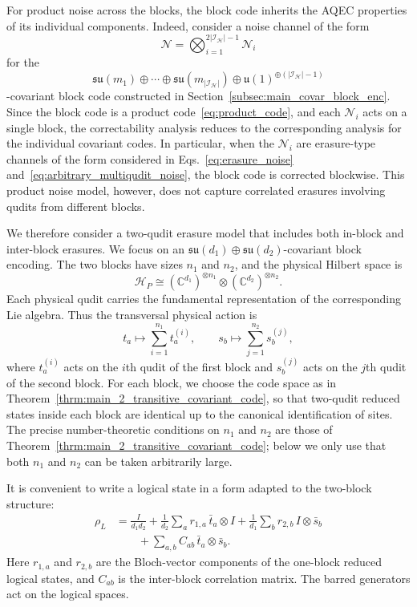 \documentclass[10pt,twocolumn,superscriptaddress,aps,amsmath,amssymb,citeautoscript,floatfix,prx,longbibliography]{revtex4-2}
\newcounter{alg}
\theoremstyle{plain}
\theoremstyle{plain}
\theoremstyle{plain}
\theoremstyle{plain}
\theoremstyle{plain}
\theoremstyle{plain}
\begin{document}
For product noise across the blocks, the block code inherits the AQEC properties of its individual components. Indeed, consider a noise channel of the form
$$
    \mathcal N
    =
    \bigotimes_{i=1}^{2|\mathcal I_{\mathcal H}|-1}
    \mathcal N_i
$$
for the
$$
    \mathfrak{su}(m_1)
    \oplus
    \cdots
    \oplus
    \mathfrak{su}(m_{|\mathcal I_{\mathcal H}|})
    \oplus
    \mathfrak{u}(1)^{\oplus(|\mathcal I_{\mathcal H}|-1)}
$$
-covariant block code constructed in Section~\ref{subsec:main_covar_block_enc}. Since the block code is a product code~\eqref{eq:product_code}, and each $\mathcal N_i$ acts on a single block, the correctability analysis reduces to the corresponding analysis for the individual covariant codes. In particular, when the $\mathcal N_i$ are erasure-type channels of the form considered in Eqs.~\eqref{eq:erasure_noise} and~\eqref{eq:arbitrary_multiqudit_noise}, the block code is corrected blockwise. This product noise model, however, does not capture correlated erasures involving qudits from different blocks.

We therefore consider a two-qudit erasure model that includes both in-block and inter-block erasures. We focus on an
$\mathfrak{su}(d_1)\oplus\mathfrak{su}(d_2)$-covariant block encoding. The two blocks have sizes $n_1$ and $n_2$, and the physical Hilbert space is
$$
    \mathcal H_P
    \cong
    (\mathbb C^{d_1})^{\otimes n_1}
    \otimes
    (\mathbb C^{d_2})^{\otimes n_2}.
$$
Each physical qudit carries the fundamental representation of the corresponding Lie algebra. Thus the transversal physical action is
$$
    t_a
    \longmapsto
    \sum_{i=1}^{n_1} t_a^{(i)},
    \qquad
    s_b
    \longmapsto
    \sum_{j=1}^{n_2} s_b^{(j)},
$$
where $t_a^{(i)}$ acts on the $i$th qudit of the first block and $s_b^{(j)}$ acts on the $j$th qudit of the second block. For each block, we choose the code space as in Theorem~\ref{thrm:main_2_transitive_covariant_code}, so that two-qudit reduced states inside each block are identical up to the canonical identification of sites. The precise number-theoretic conditions on $n_1$ and $n_2$ are those of Theorem~\ref{thrm:main_2_transitive_covariant_code}; below we only use that both $n_1$ and $n_2$ can be taken arbitrarily large.

It is convenient to write a logical state in a form adapted to the two-block structure:
$$
\begin{aligned}
    \rho_L
    &=
    \frac{I}{d_1d_2}
    +
    \frac{1}{d_2}
    \sum_a r_{1,a}\,\bar t_a\otimes I
    +
    \frac{1}{d_1}
    \sum_b r_{2,b}\,I\otimes\bar s_b
    \\
    &\qquad
    +
    \sum_{a,b}
    C_{ab}\,\bar t_a\otimes\bar s_b .
\end{aligned}
$$
Here $r_{1,a}$ and $r_{2,b}$ are the Bloch-vector components of the one-block reduced logical states, and $C_{ab}$ is the inter-block correlation matrix. The barred generators act on the logical spaces.
\end{document}
